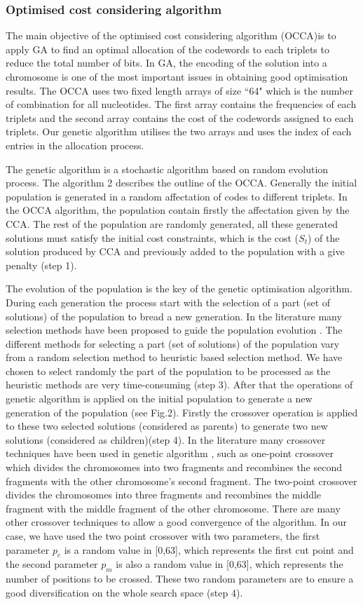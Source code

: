 \documentclass[preprint,12pt]{elsarticle}%
\begin{document}
\subsubsection{Optimised cost considering algorithm}
The main objective of the optimised cost considering algorithm (OCCA)is to apply GA to find an optimal allocation of the codewords to each triplets to reduce the total number of bits. In GA, the encoding of the solution into a chromosome is one of the most important issues in obtaining good optimisation results. The OCCA uses two fixed length arrays of size ``64" which is the number of combination for all nucleotides. The first array contains the frequencies of each triplets and the second array contains the cost of the codewords assigned to each triplets. Our genetic algorithm utilises the two arrays and uses the index of each entries in the allocation process.

The genetic algorithm is a stochastic algorithm based on random evolution process. The algorithm 2 describes the outline of the OCCA.   Generally the initial population is generated in a random affectation of codes to different triplets. In the OCCA algorithm, the population contain firstly the affectation given by the CCA. The rest of the population are randomly generated, all these generated solutions must satisfy the initial cost constraints, which is the cost ($S_t$) of the solution produced by CCA  and previously added to the population with a give penalty (step 1). 

The evolution of the population is the key of the genetic optimisation algorithm. During each generation the process start with the selection of a part (set of solutions) of the population to bread a new generation. In the literature many selection methods have been proposed to guide the population evolution \cite{bli95}. The different methods for selecting a part (set of solutions) of the population vary from a random selection method to heuristic based selection method. We have chosen to select randomly the part of the population to be processed as the heuristic methods are very time-consuming (step 3).
After that the operations of genetic algorithm is applied on the initial population to generate a new generation of the population (see Fig.2). Firstly the crossover operation is applied to these two selected solutions (considered as parents) to generate two new solutions (considered as children)(step 4). In the literature many crossover techniques have been used in genetic algorithm \cite{osa14}, such as one-point crossover which divides the chromosomes into two fragments and recombines the second fragments with the other chromosome's second fragment. The two-point crossover divides the chromosomes into three fragments and recombines the middle fragment with  the middle fragment of the other chromosome. There are many other crossover techniques to allow a good convergence of the algorithm. In our case, we have used the two point crossover with two parameters, the first parameter $p_{c}$ is a random value in [0,63], which represents the first cut point and the second parameter $p_{m}$ is also a random value in [0,63], which represents the number of positions to be crossed. These two random parameters are to ensure a good diversification on the whole search space (step 4).
\end{document}
